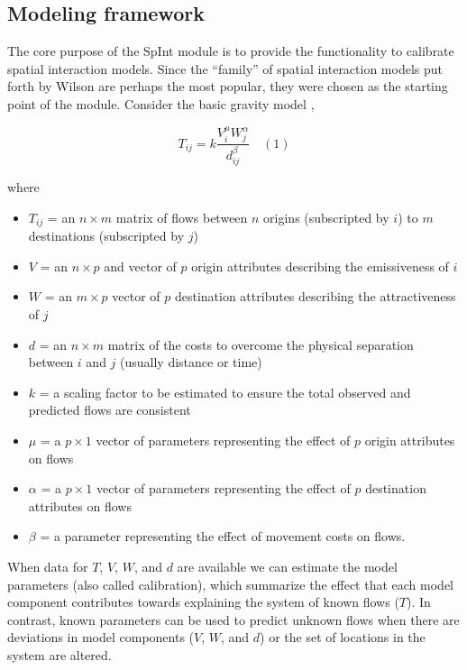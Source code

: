 \documentclass[11pt]{article}
\begin{document}
    \subsection{Modeling framework}\label{modeling-framework}

    The core purpose of the SpInt module is to provide the functionality to
calibrate spatial interaction models. Since the ``family'' of spatial
interaction models put forth by Wilson \citep{wilson_family_1971} are perhaps the
most popular, they were chosen as the starting point of the module.
Consider the basic gravity model \citep{fotheringham_spatial_1989},

\[T_{ij} = k\frac{V_{i}^\mu W_{j}^\alpha}{d_{ij}^\beta} \quad(1)\]

where

\begin{itemize}
\item
  \(T_{ij}\) = an \(n \times m\) matrix of flows between \(n\) origins
  (subscripted by \(i\)) to \(m\) destinations (subscripted by \(j\))
\item
  \(V\) = an \(n \times p\) and vector of \(p\) origin attributes
  describing the emissiveness of \(i\)
\item
  \(W\) = an \(m \times p\) vector of \(p\) destination attributes
  describing the attractiveness of \(j\)
\item
  \(d\) = an \(n \times m\) matrix of the costs to overcome the physical
  separation between \(i\) and \(j\) (usually distance or time)
\item
  \(k\) = a scaling factor to be estimated to ensure the total observed
  and predicted flows are consistent
\item
  \(\mu\) = a \(p \times 1\) vector of parameters representing the
  effect of \(p\) origin attributes on flows
\item
  \(\alpha\) = a \(p \times 1\) vector of parameters representing the
  effect of \(p\) destination attributes on flows
\item
  \(\beta\) = a parameter representing the effect of
  movement costs on flows.
\end{itemize}

When data for \(T\), \(V\), \(W\), and \(d\) are available we can
estimate the model parameters (also called calibration), which summarize
the effect that each model component contributes towards explaining the
system of known flows (\(T\)). In contrast, known parameters can be used
to predict unknown flows when there are deviations in model components
(\(V\), \(W\), and \(d\)) or the set of locations in the system are
altered.
\end{document}
